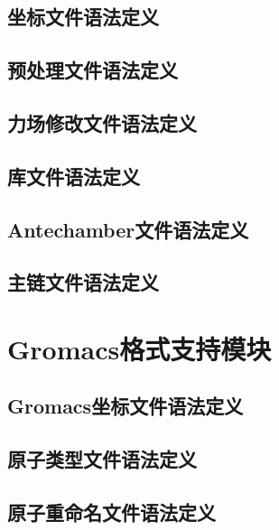 \subsection{坐标文件语法定义}


\subsection{预处理文件语法定义}


\subsection{力场修改文件语法定义}


\subsection{库文件语法定义}


\subsection{Antechamber文件语法定义}


\subsection{主链文件语法定义}


\section{Gromacs格式支持模块}
\subsection{Gromacs坐标文件语法定义}


\subsection{原子类型文件语法定义}


\subsection{原子重命名文件语法定义}


